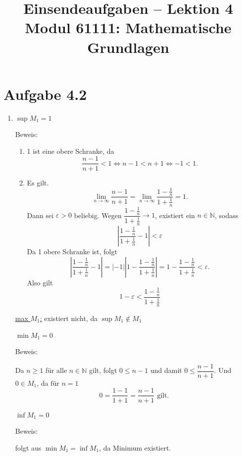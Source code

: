\documentclass[a4paper,12pt]{article}
\title{Einsendeaufgaben -- Lektion 4\\[0.5em]
\large Modul 61111: Mathematische Grundlagen}
\author{}
\date{}
\begin{document}
\maketitle

\section*{Aufgabe 4.2}

\begin{enumerate}[label=\alph*)]

    \item \underline{$\sup M_1 = 1$}

    Beweis:

    \begin{enumerate}[label=\arabic*.]
        \item 1 ist eine obere Schranke, da
        \[
            \frac{n-1}{n+1} < 1 \Leftrightarrow n-1 < n+1 \Leftrightarrow -1 < 1.
        \]

        \item Es gilt.
        \[
            \lim_{n \to \infty} \frac{n-1}{n+1}
            = \lim_{n \to \infty} \frac{1 - \frac{1}{n}}{1 + \frac{1}{n}} = 1.
        \]
        Dann sei $\varepsilon > 0$ beliebig. Wegen $\dfrac{1-\frac{1}{n}}{1+\frac{1}{n}} \to 1$,
        existiert ein $n \in \mathbb{N}$, sodass
        \[
            \left| \frac{1-\frac{1}{n}}{1+\frac{1}{n}} - 1 \right| < \varepsilon
        \]
        Da 1 obere Schranke ist, folgt
        \[
            \left| \frac{1-\frac{1}{n}}{1+\frac{1}{n}} - 1 \right|
            = |-1| \left| 1 - \frac{1-\frac{1}{n}}{1+\frac{1}{n}} \right|
            = 1 - \frac{1-\frac{1}{n}}{1+\frac{1}{n}} < \varepsilon.
        \]
        Also gilt
        \[
            1 - \varepsilon < \frac{1-\frac{1}{n}}{1+\frac{1}{n}}
        \]
    \end{enumerate}

    \underline{max $M_1$:}
    existiert nicht, da $\sup M_1 \notin M_1$

    \underline{$\min M_1 = 0$}

    Beweis:

    Da $n \geq 1$ für alle $n \in \mathbb{N}$ gilt, folgt
    $0 \leq n-1$ und damit $0 \leq \dfrac{n-1}{n+1}$.
    Und $0 \in M_1$, da für $n=1$
    \[
        0 = \frac{1-1}{1+1} = \frac{n-1}{n+1} \text{ gilt.}
    \]

    \underline{$\inf M_1 = 0$}

    Beweis:

    folgt aus $\min M_1 = \inf M_1$, da Minimum existiert.


\end{enumerate}
\end{document}
